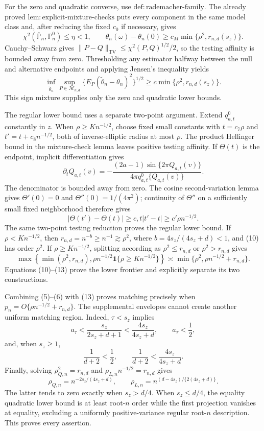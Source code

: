 For the zero and quadratic converse, use \(\mathrm{def{:}rademacher\text{-}family}\). The already proved \(\mathrm{lem{:}explicit\text{-}mixture\text{-}checks}\) puts every component in the same model class and, after reducing the fixed \(c_0\) if necessary, gives
\[
\chi^2(\overline{\mathbb P}_n,\mathbb P_n^0)\le\eta<1,
\qquad
\theta_n(\omega)-\theta_n(0)\ge c_M\min\{\rho^2,r_{n,d}(s_z)\}. \tag{9}
\]
Cauchy--Schwarz gives \(\|P-Q\|_{\mathrm{TV}}\le\chi^2(P,Q)^{1/2}/2\), so the testing affinity is bounded away from zero. Thresholding any estimator halfway between the null and alternative endpoints and applying Jensen's inequality yields
\[
\inf_{\widetilde\theta_n}\sup_{P\in\mathcal M_{n,d}}
\{E_P(\widetilde\theta_n-\theta_n)^2\}^{1/2}
\ge c\min\{\rho^2,r_{n,d}(s_z)\}.                               \tag{10}
\]
This sign mixture supplies only the zero and quadratic lower bounds.

The regular lower bound uses a separate two-point argument. Extend \(q_{a,t}^{0}\) constantly in \(z\). When \(\rho\ge K n^{-1/2}\), choose fixed small constants with \(t=c_7\rho\) and \(t'=t+c_8n^{-1/2}\), both of inverse-elliptic radius at most \(\rho\). The product Hellinger bound in the mixture-check lemma leaves positive testing affinity. If \(\Theta(t)\) is the endpoint, implicit differentiation gives
\[
\partial_tQ_{a,t}(v)
=-\frac{(2a-1)\sin\{2\pi Q_{a,t}(v)\}}
{4\pi q_{a,t}^{0}\{Q_{a,t}(v)\}}.                               \tag{11}
\]
The denominator is bounded away from zero. The cosine second-variation lemma gives \(\Theta'(0)=0\) and \(\Theta''(0)=1/(4\pi^2)\); continuity of \(\Theta''\) on a sufficiently small fixed neighborhood therefore gives
\[
|\Theta(t')-\Theta(t)|\ge c,t|t'-t|\ge c'\rho n^{-1/2}.        \tag{12}
\]
The same two-point testing reduction proves the regular lower bound. If \(\rho<K n^{-1/2}\), then \(r_{n,d}=n^{-b}\ge n^{-1}\gtrsim\rho^2\), where \(b=4s_z/(4s_z+d)<1\), and (10) has order \(\rho^2\). If \(\rho\ge K n^{-1/2}\), splitting according as \(\rho^2\le r_{n,d}\) or \(\rho^2>r_{n,d}\) gives
\[
\max\!\left\{\min(\rho^2,r_{n,d}),\rho n^{-1/2}\mathbf1\{\rho\ge Kn^{-1/2}\}\right\}
\asymp\min\{\rho^2,\rho n^{-1/2}+r_{n,d}\}.                   \tag{13}
\]
Equations (10)--(13) prove the lower frontier and explicitly separate its two constructions.

Combining (5)--(6) with (13) proves matching precisely when \(p_n=O\{\rho n^{-1/2}+r_{n,d}\}\). The supplemental envelopes cannot create another uniform matching region. Indeed, \(\tau<s_z\) implies
\[
a_\tau<\frac{s_z}{2s_z+d+1}<\frac{4s_z}{4s_z+d},
\qquad a_\tau<\frac12,                                          \tag{14}
\]
and, when \(s_z\ge1\),
\[
\frac1{d+2}<\frac12,
\qquad \frac1{d+2}<\frac{4s_z}{4s_z+d}.                         \tag{15}
\]
Finally, solving \(\rho_{Q,n}^2=r_{n,d}\) and \(\rho_{L,n}n^{-1/2}=r_{n,d}\) gives
\[
\rho_{Q,n}=n^{-2s_z/(4s_z+d)},
\qquad
\rho_{L,n}=n^{(d-4s_z)/\{2(4s_z+d)\}}.                          \tag{16}
\]
The latter tends to zero exactly when \(s_z>d/4\). When \(s_z\le d/4\), the equality quadratic lower bound is at least root-\(n\) order while the first projection vanishes at equality, excluding a uniformly positive-variance regular root-\(n\) description. This proves every assertion.